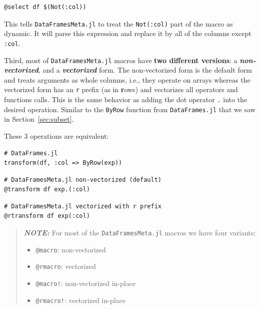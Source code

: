 \documentclass[
  notoc %
]{tufte-book}
\providecommand{\tightlist}{%
  \setlength{\itemsep}{0pt}\setlength{\parskip}{0pt}
}
\newcommand{\passthrough}[1]{#1}
\begin{document}
\begin{lstlisting}
@select df $(Not(:col))
\end{lstlisting}

This tells \passthrough{\lstinline!DataFramesMeta.jl!} to treat the
\passthrough{\lstinline!Not(:col)!} part of the macro as dynamic. It
will parse this expression and replace it by all of the columns except
\passthrough{\lstinline!:col!}.

Third, most of \passthrough{\lstinline!DataFramesMeta.jl!} macros have
\textbf{two different versions}: a \textbf{\emph{non-vectorized}}, and a
\textbf{\emph{vectorized}} form. The non-vectorized form is the default
form and treats arguments as whole columns, i.e., they operate on arrays
whereas the vectorized form has an \passthrough{\lstinline!r!} prefix
(as in \textbf{r}ows) and vectorizes all operators and functions calls.
This is the same behavior as adding the dot operator
\passthrough{\lstinline!.!} into the desired operation. Similar to the
\passthrough{\lstinline!ByRow!} function from
\passthrough{\lstinline!DataFrames.jl!} that we saw in
Section~\ref{sec:subset}.

These 3 operations are equivalent:

\begin{lstlisting}
# DataFrames.jl
transform(df, :col => ByRow(exp))
\end{lstlisting}

\begin{lstlisting}
# DataFramesMeta.jl non-vectorized (default)
@transform df exp.(:col)
\end{lstlisting}

\begin{lstlisting}
# DataFramesMeta.jl vectorized with r prefix
@rtransform df exp(:col)
\end{lstlisting}

\begin{quote}
\textbf{\emph{NOTE:}} For most of the
\passthrough{\lstinline!DataFramesMeta.jl!} macros we have four
variants:

\begin{itemize}
\tightlist
\item
  \passthrough{\lstinline!@macro!}: non-vectorized
\item
  \passthrough{\lstinline!@rmacro!}: vectorized
\item
  \passthrough{\lstinline"@macro!"}: non-vectorized in-place
\item
  \passthrough{\lstinline"@rmacro!"}: vectorized in-place
\end{itemize}
\end{quote}
\end{document}
